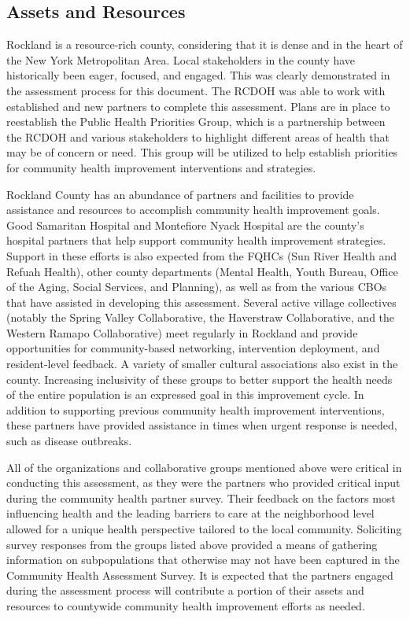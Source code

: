 \documentclass[
  english,
  letterpaper,
]{report}
\begin{document}
\subsection{Assets and Resources}\label{assets-and-resources-2}

Rockland is a resource-rich county, considering that it is dense and in
the heart of the New York Metropolitan Area. Local stakeholders in the
county have historically been eager, focused, and engaged. This was
clearly demonstrated in the assessment process for this document. The
RCDOH was able to work with established and new partners to complete
this assessment. Plans are in place to reestablish the Public Health
Priorities Group, which is a partnership between the RCDOH and various
stakeholders to highlight different areas of health that may be of
concern or need. This group will be utilized to help establish
priorities for community health improvement interventions and
strategies.

Rockland County has an abundance of partners and facilities to provide
assistance and resources to accomplish community health improvement
goals. Good Samaritan Hospital and Montefiore Nyack Hospital are the
county's hospital partners that help support community health
improvement strategies. Support in these efforts is also expected from
the FQHCs (Sun River Health and Refuah Health), other county departments
(Mental Health, Youth Bureau, Office of the Aging, Social Services, and
Planning), as well as from the various CBOs that have assisted in
developing this assessment. Several active village collectives (notably
the Spring Valley Collaborative, the Haverstraw Collaborative, and the
Western Ramapo Collaborative) meet regularly in Rockland and provide
opportunities for community-based networking, intervention deployment,
and resident-level feedback. A variety of smaller cultural associations
also exist in the county. Increasing inclusivity of these groups to
better support the health needs of the entire population is an expressed
goal in this improvement cycle. In addition to supporting previous
community health improvement interventions, these partners have provided
assistance in times when urgent response is needed, such as disease
outbreaks.

All of the organizations and collaborative groups mentioned above were
critical in conducting this assessment, as they were the partners who
provided critical input during the community health partner survey.
Their feedback on the factors most influencing health and the leading
barriers to care at the neighborhood level allowed for a unique health
perspective tailored to the local community. Soliciting survey responses
from the groups listed above provided a means of gathering information
on subpopulations that otherwise may not have been captured in the
Community Health Assessment Survey. It is expected that the partners
engaged during the assessment process will contribute a portion of their
assets and resources to countywide community health improvement efforts
as needed.
\end{document}
